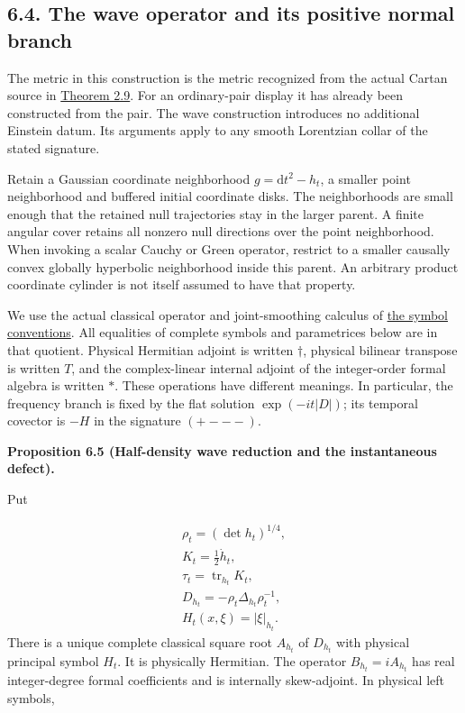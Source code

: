\documentclass[
  english,
  11pt,
  reqno]{amsart}
\makeatletter
\newcommand{\pandocstatementheading}[1]{%
  \par\addpenalty{\@beginparpenalty}%
  \addvspace{.5\baselineskip plus .2\baselineskip minus .2\baselineskip}%
  {\normalfont\bfseries #1\par}%
  \nobreak\@afterindenttrue\@afterheading
}
\makeatother
\begin{document}
\subsection{6.4. The wave operator and its positive normal
branch}\label{the-wave-operator-and-its-positive-normal-branch}\label{sec:online-wave-factorization}

The metric in this construction is the metric recognized from the actual
Cartan source in \hyperref[thm:online-cartan-collar-recognition]{Theorem
2.9}. For an ordinary-pair display it has already been constructed from
the pair. The wave construction introduces no additional Einstein datum.
Its arguments apply to any smooth Lorentzian collar of the stated
signature.

Retain a Gaussian coordinate neighborhood \(g=\mathrm dt^2-h_t\), a
smaller point neighborhood and buffered initial coordinate disks. The
neighborhoods are small enough that the retained null trajectories stay
in the larger parent. A finite angular cover retains all nonzero null
directions over the point neighborhood. When invoking a scalar Cauchy or
Green operator, restrict to a smaller causally convex globally
hyperbolic neighborhood inside this parent. An arbitrary product
coordinate cylinder is not itself assumed to have that property.

We use the actual classical operator and joint-smoothing calculus of
\hyperref[def:online-complete-symbol-calculus]{the symbol conventions}.
All equalities of complete symbols and parametrices below are in that
quotient. Physical Hermitian adjoint is written \(\dagger\), physical
bilinear transpose is written \(T\), and the complex-linear internal
adjoint of the integer-order formal algebra is written \(*\). These
operations have different meanings. In particular, the frequency branch
is fixed by the flat solution \(\exp(-it|D|)\); its temporal covector is
\(-H\) in the signature \((+---)\).

\pandocstatementheading{\leavevmode{}\label{prop:online-wave-half-density-reduction}Proposition 6.5 (Half-density wave reduction and the instantaneous
defect).}

Put

\label{eq:online-wave-density-and-spatial-operator} \[
\begin{gathered}
\rho_t=(\det h_t)^{1/4}, \\
K_t=\tfrac12\dot h_t, \\
\tau_t=\operatorname{tr}_{h_t}K_t, \\
D_{h_t}=-\rho_t\Delta_{h_t}\rho_t^{-1}, \\
H_t(x,\xi)=|\xi|_{h_t}.
\end{gathered}
\] There is a unique complete classical square root \(A_{h_t}\) of
\(D_{h_t}\) with physical principal symbol \(H_t\). It is physically
Hermitian. The operator \(B_{h_t}=iA_{h_t}\) has real integer-degree
formal coefficients and is internally skew-adjoint. In physical left
symbols,
\end{document}
